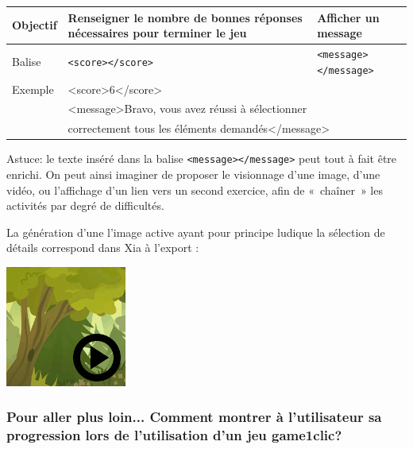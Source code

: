 {%
\begin{center}
 \begin{tabular}{|l|p{2in}|p{2in}|}
 \hline
  Objectif & Renseigner le nombre de bonnes réponses nécessaires pour terminer le jeu & Afficher un message\\
  \hline
  Balise & \verb|<score></score>| & \verb|<message></message>|\\
  \hline
  Exemple & \multicolumn{2}{|l|}{<score>6</score>}\\
   & \multicolumn{2}{|l|}{<message>Bravo, vous avez réussi à sélectionner}\\
    & \multicolumn{2}{|l|}{correctement tous les éléments demandés</message>}\\
  \hline
 \end{tabular}
\end{center}

Astuce: le texte inséré dans la balise \verb|<message></message>| peut 
tout à fait être enrichi. 
On peut ainsi imaginer de proposer le visionnage d'une image, d'une vidéo, ou l'affichage d'un lien vers un second exercice, afin 
de «~chaîner~» les activités par degré de difficultés.

La génération d'une l'image active ayant pour principe ludique la sélection de détails
correspond dans Xia à l'export :

\begin{center}
\includegraphics[scale=0.7]{./images/game1clic} 
\end{center}

\subsubsection{Pour aller plus loin... Comment montrer à l'utilisateur sa progression lors de l'utilisation d'un jeu game1clic?}\label{detail_progression}

}
